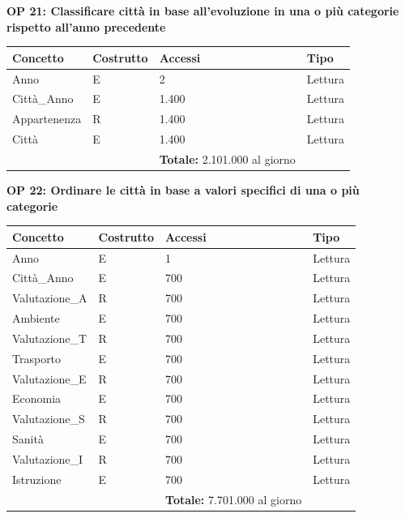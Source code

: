 \documentclass[a4paper,12pt]{report}
\begin{document}
            \textbf{OP 21: Classificare città in base all’evoluzione in una o più categorie rispetto all’anno precedente}
        	\begin{table}[H]
            \centering
             \begin{tabular}{llll}
             \rowcolor{yellow!20} \textbf{Concetto} & \textbf{Costrutto} & \textbf{Accessi} & \textbf{Tipo}\\ [0.5ex] 
             \hline
             Anno & E & 2 & Lettura \\ 
             Città\_Anno & E & 1.400 & Lettura \\ 
             Appartenenza & R & 1.400 & Lettura \\ 
             Città & E & 1.400 & Lettura \\ 
             \hline
                \rowcolor{yellow!20} &   & \textbf{Totale:}  2.101.000 al giorno &  \\ [1ex] 
             
             \end{tabular}
            \end{table}

            \textbf{OP 22: Ordinare le città in base a valori specifici di una o più categorie}
        	\begin{table}[H]
            \centering
             \begin{tabular}{llll}
             \rowcolor{yellow!20} \textbf{Concetto} & \textbf{Costrutto} & \textbf{Accessi} & \textbf{Tipo}\\ [0.5ex] 
             \hline
             Anno & E & 1 & Lettura \\ 
             Città\_Anno & E & 700 & Lettura \\ 
             Valutazione\_A & R & 700 & Lettura \\ 
             Ambiente & E & 700 & Lettura \\
             Valutazione\_T & R & 700 & Lettura \\ 
             Trasporto & E & 700 & Lettura \\
             Valutazione\_E & R & 700 & Lettura \\ 
             Economia & E & 700 & Lettura \\
             Valutazione\_S & R & 700 & Lettura \\ 
             Sanità & E & 700 & Lettura \\
             Valutazione\_I & R & 700 & Lettura \\ 
             Istruzione & E & 700 & Lettura \\
             \hline
                \rowcolor{yellow!20} &   & \textbf{Totale:}  7.701.000 al giorno &  \\ [1ex] 
             
             \end{tabular}
            \end{table}
\end{document}
